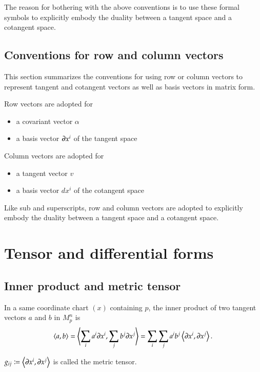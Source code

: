 \documentclass[11pt, a4paper]{book}
\begin{document}
The reason for bothering with the above conventions is to use these formal symbols to
explicitly embody the duality between a tangent space and a cotangent space.

\subsection{Conventions for row and column vectors}

This section summarizes the conventions for using row or column vectors to represent
tangent and cotangent vectors as well as basis vectors in matrix form.

Row vectors are adopted for
\begin{itemize}
\item a covariant vector $\alpha$
\item a basis vector $\boldsymbol{\partial}x^i$ of the tangent space
\end{itemize}
Column vectors are adopted for
\begin{itemize}
\item a tangent vector $v$
\item a basis vector $dx^i$ of the cotangent space
\end{itemize}

Like sub and superscripts, row and column vectors are adopted to explicitly embody the
duality between a tangent space and a cotangent space.

\section{Tensor and differential forms}

\subsection{Inner product and metric tensor}
\label{sec:metric-tensor}

In a same coordinate chart $(x)$ containing $p$, the inner product of two tangent vectors
$a$ and $b$ in $M_p^n$ is
\begin{equation}
  \label{eq:inner-product}
  \left\langle a,b \right\rangle = \left\langle \sum_i a^i \boldsymbol{\partial}x^i, \sum_j b^j
    \boldsymbol{\partial}x^j \right\rangle = \sum_i\sum_j a^i b^j \left\langle \boldsymbol{\partial}x^i,
    \boldsymbol{\partial}x^j \right\rangle.
\end{equation}

\begin{Definition}
  \label{def:metric-tensor}
  $g_{ij} \coloneqq \left\langle \boldsymbol{\partial}x^i, \boldsymbol{\partial}x^j \right\rangle$ is
  called the metric tensor.
\end{Definition}
\end{document}
